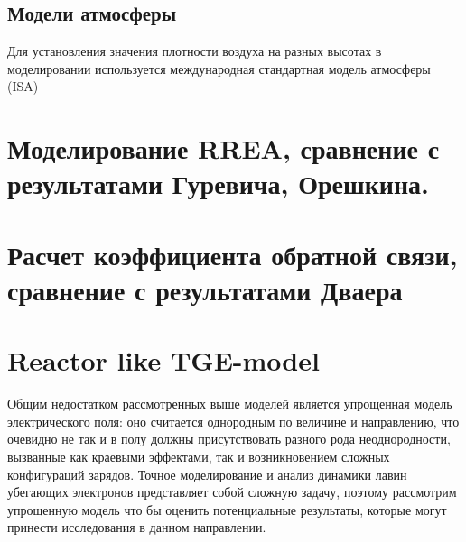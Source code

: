 \subsection{Модели атмосферы}
Для установления значения плотности воздуха на разных высотах в моделировании используется международная стандартная модель атмосферы (ISA)


\section{Моделирование RREA, сравнение с результатами Гуревича, Орешкина.}\label{sec:thunderstorm/rrea}



\section{Расчет коэффициента обратной связи, сравнение с результатами Дваера}\label{sec:thunderstorm/rdfm}
\section{Reactor like TGE-model}\label{sec:thunderstorm/reactor}

Общим недостатком рассмотренных выше моделей является упрощенная модель электрического поля: оно считается однородным по величине и направлению, что очевидно не так и в полу должны присутствовать разного рода неоднородности, вызванные как краевыми эффектами, так и возникновением сложных конфигураций зарядов. Точное моделирование и анализ динамики лавин убегающих электронов представляет собой сложную задачу, поэтому рассмотрим упрощенную модель что бы оценить потенциальные результаты, которые могут принести исследования в данном направлении. 


